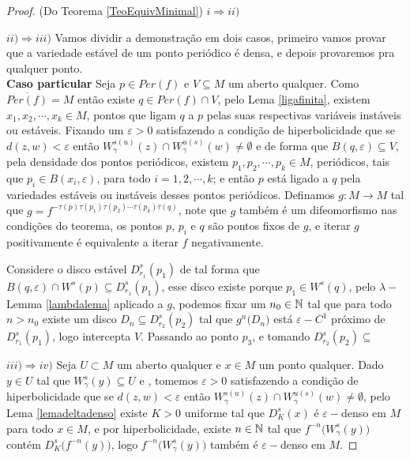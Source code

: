 \begin{proof}(Do Teorema \ref{TeoEquivMinimal}) $i\Rightarrow ii)$

$ii)\Rightarrow iii)$ Vamos dividir a demonstração em dois casos, primeiro vamos provar que a variedade estável de um ponto periódico é densa, e depois provaremos pra qualquer ponto.\\
\textbf{Caso particular} Seja $p\in Per(f)$ e $V\subseteq M$ um aberto qualquer. Como $\overline{Per(f)}=M$ então existe $q\in Per(f)\cap V$, pelo Lema \ref{ligafinita}, existem $x_1,x_2,\cdots,x_k\in M$, pontos que ligam $q$ a $p$ pelas suas respectivas variáveis instáveis ou estáveis. Fixando um $\varepsilon>0$ satisfazendo a condição de hiperbolicidade que se $d(z,w)<\varepsilon$ então $W^{s(u)}_{\gamma}(z)\cap W^{u(s)}_{\gamma}(w)\neq \emptyset$ e de forma que $B(q,\varepsilon)\subseteq V$, pela densidade dos pontos periódicos, existem $p_1,p_2,\cdots,p_k\in M$, periódicos, tais que $p_i\in B(x_i,\varepsilon)$, para todo $i=1,2,\cdots,k$; e então $p$ está ligado a $q$ pela variedades estáveis ou instáveis desses pontos periódicos. Definamos $g:M\to M$ tal que $g=f^{-\tau(p)\tau(p_1)\tau(p_2)\cdots\tau(p_k)\tau(q)}$, note que $g$ também é um difeomorfismo nas condições do teorema, os pontos $p$, $p_i$ e $q$ são pontos fixos de $g$, e iterar $g$ positivamente é equivalente a iterar $f$ negativamente.

Considere o disco estável $D^s_{r_1}(p_1)$ de tal forma que $B(q,\varepsilon)\cap W^s(p)\subseteq D^s_{r_1}(p_1)$, esse disco existe porque $p_1\in W^s(q)$, pelo $\lambda-$Lemma \ref{lambdalema} aplicado a $g$, podemos fixar um $n_0\in\mathbb{N}$ tal que para todo $n>n_0$ existe um disco $D_n\subseteq D^s_{r_2}(p_2)$ tal que $g^n\big(D_n\big)$ está $\varepsilon-C^1$ próximo de $D^s_{r_1}(p_1)$, logo intercepta $V$. Passando ao ponto $p_3$, e tomando $D^s_{r_2}(p_2)\subseteq$





\newpage









$iii)\Rightarrow iv)$ Seja $U\subset M$ um aberto qualquer e $x\in M$ um ponto qualquer. Dado $y\in U$ tal que $W^{s}_{\gamma}(y)\subseteq U$ e , tomemos $\varepsilon>0$ satisfazendo a condição de hiperbolicidade que se $d(z,w)<\varepsilon$ então $W^{s(u)}_{\gamma}(z)\cap W^{u(s)}_{\gamma}(w)\neq \emptyset$, pelo Lema \ref{lemadeltadenso} existe $K>0$ uniforme tal que $D^{s}_{K}(x)$ é $\varepsilon-$denso em $M$ para todo $x\in M$, e por hiperbolicidade, existe $n\in\mathbb{N}$ tal que $f^{-n}\big(W^{s}_{\gamma}(y)\big)$ contém $D_{K}^{s}\big(f^{-n}(y)\big)$, logo $f^{-n}\big(W^{s}_{\gamma}(y)\big)$ também é $\varepsilon-$denso em $M$.


\end{proof}
